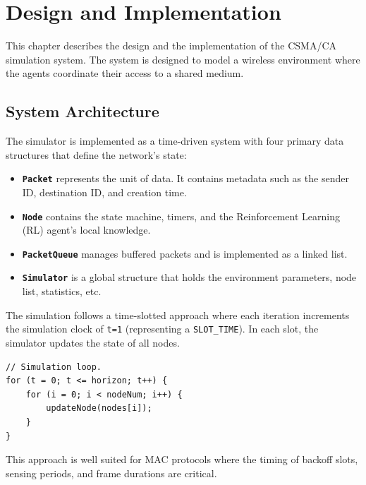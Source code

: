 \chapter{Design and Implementation}
This chapter describes the design and the implementation of the CSMA/CA simulation system.
The system is designed to model a wireless environment where the agents coordinate their access to a shared medium. 

\section{System Architecture}
The simulator is implemented as a time-driven system with four primary data structures that define the network's state:
\begin{itemize}
    \item \textbf{\texttt{Packet}} represents the unit of data. It contains metadata such as the sender ID, destination ID, and creation time.
    \item \textbf{\texttt{Node}} contains the state machine, timers, and the Reinforcement Learning (RL) agent's local knowledge.
    \item \textbf{\texttt{PacketQueue}} manages buffered packets and is implemented as a linked list.
    \item \textbf{\texttt{Simulator}} is a global structure that holds the environment parameters, node list, statistics, etc.
\end{itemize}

The simulation follows a time-slotted approach where each iteration increments the simulation clock of \texttt{t=1} (representing a \texttt{SLOT\_TIME}). In each slot, the simulator updates the state of all nodes.

\begin{lstlisting}[style=CStyle]
// Simulation loop.
for (t = 0; t <= horizon; t++) {
    for (i = 0; i < nodeNum; i++) {
        updateNode(nodes[i]);
    }
}
\end{lstlisting}
This approach is well suited for MAC protocols where the timing of backoff slots, sensing periods, and frame durations are critical.

